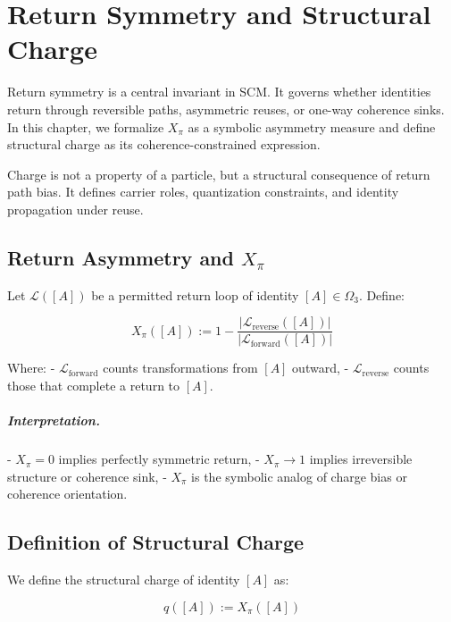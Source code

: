 \chapter{Return Symmetry and Structural Charge} \label{chapter-charge}

Return symmetry is a central invariant in SCM. It governs whether identities return through reversible paths, asymmetric reuses, or one-way coherence sinks. In this chapter, we formalize $X_\pi$ as a symbolic asymmetry measure and define structural charge as its coherence-constrained expression.

Charge is not a property of a particle, but a structural consequence of return path bias. It defines carrier roles, quantization constraints, and identity propagation under reuse.

\section{Return Asymmetry and $X_\pi$} \label{sec:return-asymmetry}

Let $\mathcal{L}([A])$ be a permitted return loop of identity $[A] \in \Omega_3$. Define:

\begin{equation}
X_\pi([A]) := 1 - \frac{|\mathcal{L}_{\text{reverse}}([A])|}{|\mathcal{L}_{\text{forward}}([A])|}
\end{equation}

Where:
- $\mathcal{L}_{\text{forward}}$ counts transformations from $[A]$ outward,
- $\mathcal{L}_{\text{reverse}}$ counts those that complete a return to $[A]$.

\paragraph{Interpretation.}
- $X_\pi = 0$ implies perfectly symmetric return,
- $X_\pi \to 1$ implies irreversible structure or coherence sink,
- $X_\pi$ is the symbolic analog of charge bias or coherence orientation.

\section{Definition of Structural Charge} \label{sec:structural-charge}

We define the structural charge of identity $[A]$ as:

\begin{equation}
q([A]) := X_\pi([A])
\end{equation}

